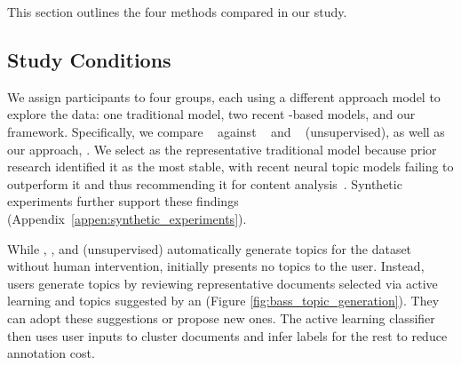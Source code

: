 
This section outlines the four methods compared in our study.



\subsection{Study Conditions}\label{subsec:study_conditions}


%

We assign participants to four groups, each using a different approach model to explore the data: one traditional model, two recent \mm{}-based models, and our framework. Specifically, we compare \lda{}~\cite{blei2003lda} against \topicgpt{}~\cite{pham2024topicgpt} and \lloom{}~\cite{lam2024concept} (unsupervised), as well as our approach, \bass{}. 
%
We select \lda{} as the representative traditional model because prior research identified it as the most stable, with recent neural topic models failing to outperform it and thus recommending it for content analysis~\cite{hoyle-21}.  Synthetic experiments further support these findings (Appendix~\ref{appen:synthetic_experiments}).



%
While \lda{}, \topicgpt{}, and \lloom{} (unsupervised) automatically
generate topics for the dataset without human intervention, \bass{}
initially presents no topics to the user.
%
Instead, users generate topics by reviewing representative documents selected via active learning and topics suggested by an \mm{} (Figure \ref{fig:bass_topic_generation}). 
%
They can adopt these suggestions or propose new ones.
%
The active learning classifier then uses user inputs to cluster documents and infer labels for the rest to reduce annotation cost.
%

